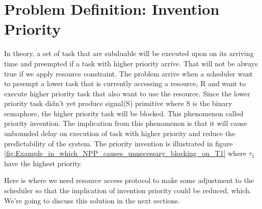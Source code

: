 \section{Problem Definition: Invention Priority}

In theory, a set of task that are subduable will be executed upon on its arriving time and preempted if a task with higher priority arrive. That will not be always true if we apply resource constraint. The problem arrive when a scheduler want to preempt a lower task that is currently accessing a  resource, R and want to execute higher priority task that also want to use the resource. Since the lower priority task didn't yet produce signal(S) primitive where S is the binary semaphore, the higher priority task will be blocked. This phenomenon called priority invention. The implication from this phenomenon is that it will cause unbounded delay on execution of task with higher priority and reduce the predictability of the system. The priority invention is illustrated in figure \ref{fig:Example_in_which_NPP_causes_unnecessary_blocking_on_T1} where $ \tau_{1} $ have the highest priority.

Here is where we need resource access protocol to make some adjustment to the scheduler so that the implication of invention priority could be reduced, which. We're going to discuss this solution in the next sections.
